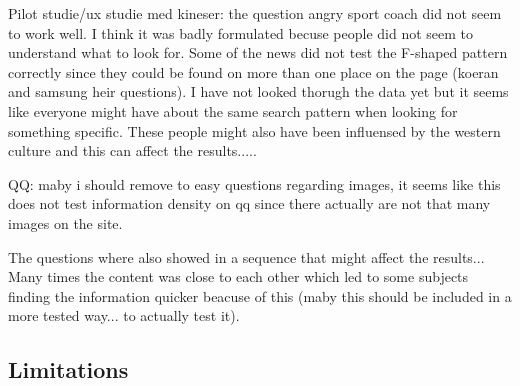 Pilot studie/ux studie med kineser:
the question angry sport coach did not seem to work well. I think it was badly formulated becuse people did not seem to understand what to look for. Some of the news did not test the F-shaped pattern correctly since they could be found on more than one place on the page (koeran and samsung heir questions). I have not looked thorugh the data yet but it seems like everyone might have about the same search pattern when looking for something specific. These people might also have been influensed by the western culture and this can affect the results.....

QQ: maby i should remove to easy questions regarding images, it seems like this does not test information density on qq since there actually are not that many images on the site.

The questions where also showed in a sequence that might affect the results... Many times the content was close to each other which led to some subjects finding the information quicker beacuse of this (maby this should be included in a more tested way... to actually test it).


\subsection{Limitations}